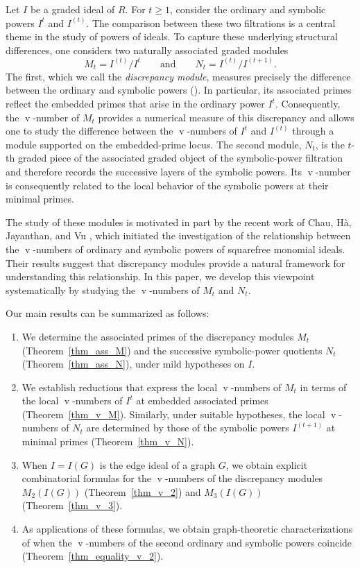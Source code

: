 \documentclass[12pt]{amsart}
\def\v{\operatorname{v}}
\begin{document}
Let $I$ be a graded ideal of $R$. For $t \ge 1$, consider the ordinary and symbolic powers $I^t$ and $I^{(t)}$. The comparison between these two filtrations is a central theme in the study of powers of ideals. To capture these underlying structural differences, one considers two naturally associated graded modules
\[
M_t = I^{(t)} / I^t \qquad\text{and}\qquad N_t = I^{(t)} / {I^{(t+1)}}.
\]
The first, which we call the \textit{discrepancy module}, measures precisely the difference between the ordinary and symbolic powers (\cite{hm26}). In particular, its associated primes reflect the embedded primes that arise in the ordinary power $I^t$. Consequently, the $\v$-number of $M_t$ provides a numerical measure of this discrepancy and allows one to study the difference between the $\v$-numbers of $I^t$ and $I^{(t)}$ through a module supported on the embedded-prime locus. The second module, $N_t$, is the $t$-th graded piece of the associated graded object of the symbolic-power filtration and therefore records the successive layers of the symbolic powers. Its $\v$-number is consequently related to the local behavior of the symbolic powers at their minimal primes.

The study of these modules is motivated in part by the recent work of Chau, Hà, Jayanthan, and Vu \cite{chjv26}, which initiated the investigation of the relationship between the $\v$-numbers of ordinary and symbolic powers of squarefree monomial ideals. Their results suggest that discrepancy modules provide a natural framework for understanding this relationship. In this paper, we develop this viewpoint systematically by studying the $\v$-numbers of $M_t$ and $N_t$.

Our main results can be summarized as follows:
\begin{enumerate}
    \item We determine the associated primes of the discrepancy modules $M_t$ (Theorem~\ref{thm_ass_M}) and the successive symbolic-power quotients $N_t$ (Theorem~\ref{thm_ass_N}), under mild hypotheses on $I$.
    \item We establish reductions that express the local $\v$-numbers of $M_t$ in terms of the local $\v$-numbers of $I^t$ at embedded associated primes (Theorem~\ref{thm_v_M}). Similarly, under suitable hypotheses, the local $\v$-numbers of $N_t$ are determined by those of the symbolic powers $I^{(t+1)}$ at minimal primes (Theorem~\ref{thm_v_N}).
    \item When $I = I(G)$ is the edge ideal of a graph $G$, we obtain explicit combinatorial formulas for the $\v$-numbers of the discrepancy modules $M_2(I(G))$ (Theorem~\ref{thm_v_2}) and $M_3(I(G))$ (Theorem~\ref{thm_v_3}).
    \item As applications of these formulas, we obtain graph-theoretic characterizations of when the $\v$-numbers of the second ordinary and symbolic powers coincide (Theorem~\ref{thm_equality_v_2}).
\end{enumerate}
\end{document}
